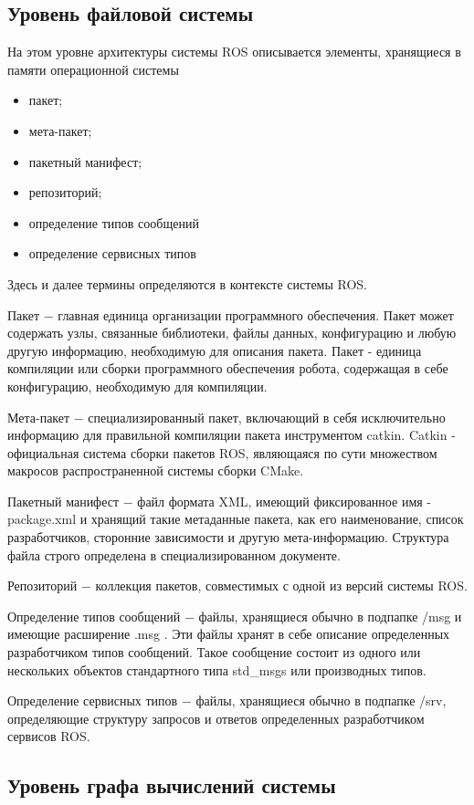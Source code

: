 \documentclass[oneside,final,14pt]{extreport}
\begin{document}
\subsection{Уровень файловой системы}
На этом уровне архитектуры системы ROS описывается элементы, хранящиеся в памяти операционной системы
\begin{itemize}
\item пакет;
\item мета-пакет;
\item пакетный манифест;
\item репозиторий;
\item определение типов сообщений
\item определение сервисных типов 
\end{itemize}

Здесь и далее термины определяются в контексте системы ROS.

Пакет $-$ главная единица организации программного обеспечения. Пакет может содержать узлы, связанные библиотеки, файлы данных, конфигурацию и любую другую информацию, необходимую для описания пакета.  Пакет - единица компиляции или сборки программного обеспечения робота, содержащая в себе конфигурацию, необходимую для компиляции. 

Мета-пакет $-$ специализированный пакет, включающий в себя исключительно информацию для правильной компиляции пакета инструментом catkin. Catkin - официальная система сборки пакетов ROS, являющаяся по сути множеством макросов распространенной системы сборки CMake.

Пакетный манифест $-$ файл формата XML, имеющий фиксированное имя - package.xml и хранящий такие метаданные пакета, как его наименование, список разработчиков, сторонние зависимости и другую мета-информацию. Структура файла строго определена в специализированном документе.

Репозиторий $-$ коллекция пакетов, совместимых с одной из версий системы  ROS.

Определение типов сообщений $-$ файлы, хранящиеся обычно в подпапке /msg и имеющие расширение  .msg . Эти файлы хранят в себе описание определенных разработчиком типов сообщений. Такое сообщение состоит из одного или нескольких объектов стандартного типа std_msgs или производных типов. 

Определение сервисных типов $-$ файлы, хранящиеся обычно в подпапке /srv, определяющие структуру запросов и ответов определенных разработчиком сервисов ROS.
\subsection{Уровень графа вычислений системы}
\end{document}
